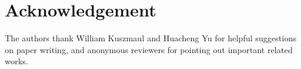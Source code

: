 \documentclass{article}
\theoremstyle{plain}
\theoremstyle{definition}  \newtheorem{definition}[theorem]{Definition}
\begin{document}
\section*{Acknowledgement}

The authors thank William Kuszmaul and Huacheng Yu for helpful suggestions on paper writing, and anonymous reviewers for pointing out important related works.



\end{document}
